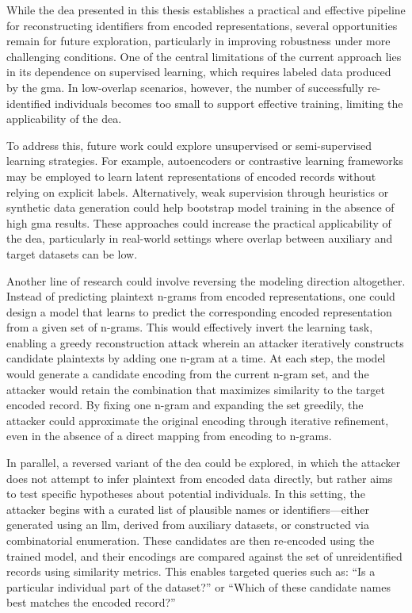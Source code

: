 While the \ac{dea} presented in this thesis establishes a practical and effective pipeline for reconstructing identifiers from encoded representations, several opportunities remain for future exploration, particularly in improving robustness under more challenging conditions.
One of the central limitations of the current approach lies in its dependence on supervised learning, which requires labeled data produced by the \ac{gma}.
In low-overlap scenarios, however, the number of successfully re-identified individuals becomes too small to support effective training, limiting the applicability of the \ac{dea}.

To address this, future work could explore unsupervised or semi-supervised learning strategies.
For example, autoencoders or contrastive learning frameworks may be employed to learn latent representations of encoded records without relying on explicit labels.
Alternatively, weak supervision through heuristics or synthetic data generation could help bootstrap model training in the absence of high \ac{gma} results.
These approaches could increase the practical applicability of the \ac{dea}, particularly in real-world settings where overlap between auxiliary and target datasets can be low.

Another line of research could involve reversing the modeling direction altogether.
Instead of predicting plaintext n-grams from encoded representations, one could design a model that learns to predict the corresponding encoded representation from a given set of n-grams.
This would effectively invert the learning task, enabling a greedy reconstruction attack wherein an attacker iteratively constructs candidate plaintexts by adding one n-gram at a time.
At each step, the model would generate a candidate encoding from the current n-gram set, and the attacker would retain the combination that maximizes similarity to the target encoded record.
By fixing one n-gram and expanding the set greedily, the attacker could approximate the original encoding through iterative refinement, even in the absence of a direct mapping from encoding to n-grams.

In parallel, a reversed variant of the \ac{dea} could be explored, in which the attacker does not attempt to infer plaintext from encoded data directly, but rather aims to test specific hypotheses about potential individuals.
In this setting, the attacker begins with a curated list of plausible names or identifiers—either generated using an \ac{llm}, derived from auxiliary datasets, or constructed via combinatorial enumeration.
These candidates are then re-encoded using the trained model, and their encodings are compared against the set of unreidentified records using similarity metrics.
This enables targeted queries such as: ``Is a particular individual part of the dataset?'' or ``Which of these candidate names best matches the encoded record?''

